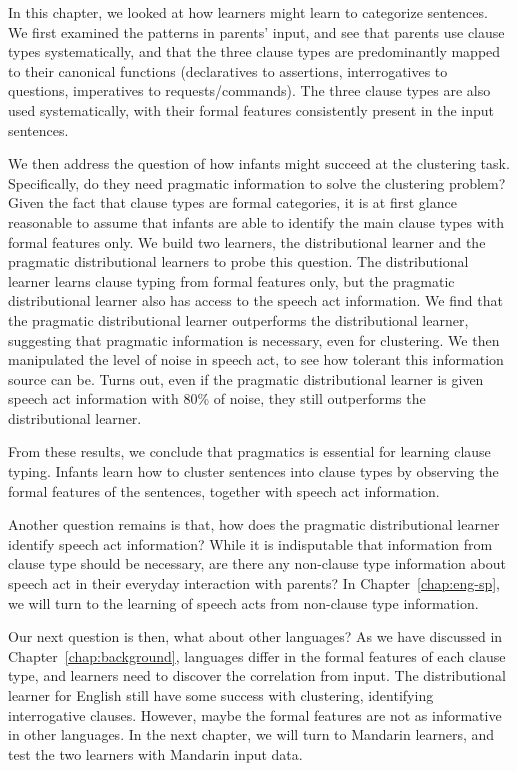 In this chapter, we looked at how learners might learn to categorize sentences. We first examined the patterns in parents' input, and see that parents use clause types systematically, and that the three clause types are predominantly mapped to their canonical functions (declaratives to assertions, interrogatives to questions, imperatives to requests/commands). The three clause types are also used systematically, with their formal features consistently present in the input sentences. 

We then address the question of how infants might succeed at the clustering task. Specifically, do they need pragmatic information to solve the clustering problem? Given the fact that clause types are formal categories, it is at first glance reasonable to assume that infants are able to identify the main clause types with formal features only. We build two learners, the distributional learner and the pragmatic distributional learners to probe this question. The distributional learner learns clause typing from formal features only, but the pragmatic distributional learner also has access to the speech act information. We find that the pragmatic distributional learner outperforms the distributional learner, suggesting that pragmatic information is necessary, even for clustering. We then manipulated the level of noise in speech act, to see how tolerant this information source can be. Turns out, even if the pragmatic distributional learner is given speech act information with 80\% of noise, they still outperforms the distributional learner. 

From these results, we conclude that pragmatics is essential for learning clause typing. Infants learn how to cluster sentences into clause types by observing the formal features of the sentences, together with speech act information.


Another question remains is that, how does the pragmatic distributional learner identify speech act information? While it is indisputable that information from clause type should be necessary, are there any non-clause type information about speech act in their everyday interaction with parents? In Chapter~\ref{chap:eng-sp}, we will turn to the learning of speech acts from non-clause type information.


Our next question is then, what about other languages? As we have discussed in Chapter~\ref{chap:background}, languages differ in the formal features of each clause type, and learners need to discover the correlation from input. The distributional learner for English still have some success with clustering, identifying interrogative clauses. However, maybe the formal features are not as informative in other languages. In the next chapter, we will turn to Mandarin learners, and test the two learners with Mandarin input data. 

